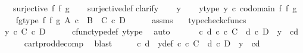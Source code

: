 \begin{isabellebody}
\ \ \ {\isachardoublequoteopen}surjective\ {\isacharparenleft}{\kern0pt}f\ {\isasymtimes}\isactrlsub f\ g{\isacharparenright}{\kern0pt}{\isachardoublequoteclose}\isanewline
%
\isadelimproof
\ \ %
\endisadelimproof
%
\isatagproof
{}\isamarkupfalse%
\ surjective{\isacharunderscore}{\kern0pt}def\isanewline
{}\isamarkupfalse%
{\isacharparenleft}{\kern0pt}clarify{\isacharparenright}{\kern0pt}\isanewline
\ \ \isamarkupfalse%
\ y\isanewline
\ \ \isamarkupfalse%
\ y{\isacharunderscore}{\kern0pt}type{\isacharcolon}{\kern0pt}\ {\isachardoublequoteopen}y\ {\isasymin}\isactrlsub c\ codomain\ {\isacharparenleft}{\kern0pt}f\ {\isasymtimes}\isactrlsub f\ g{\isacharparenright}{\kern0pt}{\isachardoublequoteclose}\isanewline
\ \ \isamarkupfalse%
\ fg{\isacharunderscore}{\kern0pt}type{\isacharcolon}{\kern0pt}\ {\isachardoublequoteopen}f\ {\isasymtimes}\isactrlsub f\ g{\isacharcolon}{\kern0pt}\ A\ {\isasymtimes}\isactrlsub c\ \ B\ {\isasymrightarrow}\ C\ {\isasymtimes}\isactrlsub c\ D{\isachardoublequoteclose}\isanewline
\ \ \ \ \isamarkupfalse%
\ assms\ \ \isamarkupfalse%
\ typecheck{\isacharunderscore}{\kern0pt}cfuncs\ \ \ \ \isanewline
\ \ \isamarkupfalse%
\ \isamarkupfalse%
\ {\isachardoublequoteopen}y\ {\isasymin}\isactrlsub c\ C\ {\isasymtimes}\isactrlsub c\ D{\isachardoublequoteclose}\isanewline
\ \ \ \ \isamarkupfalse%
\ cfunc{\isacharunderscore}{\kern0pt}type{\isacharunderscore}{\kern0pt}def\ y{\isacharunderscore}{\kern0pt}type\ \isamarkupfalse%
\ auto\isanewline
\ \ \isamarkupfalse%
\ \isamarkupfalse%
\ {\isachardoublequoteopen}{\isasymexists}\ c\ d{\isachardot}{\kern0pt}\ c\ {\isasymin}\isactrlsub c\ C\ {\isasymand}\ d\ {\isasymin}\isactrlsub c\ D\ {\isasymand}\ y\ {\isacharequal}{\kern0pt}\ {\isasymlangle}c{\isacharcomma}{\kern0pt}d{\isasymrangle}{\isachardoublequoteclose}\isanewline
\ \ \ \ \isamarkupfalse%
\ cart{\isacharunderscore}{\kern0pt}prod{\isacharunderscore}{\kern0pt}decomp\ \isamarkupfalse%
\ blast\isanewline
\ \ \isamarkupfalse%
\ \isamarkupfalse%
\ c\ d\ \ y{\isacharunderscore}{\kern0pt}def{\isacharcolon}{\kern0pt}\ {\isachardoublequoteopen}c\ {\isasymin}\isactrlsub c\ C\ {\isasymand}\ d\ {\isasymin}\isactrlsub c\ D\ {\isasymand}\ y\ {\isacharequal}{\kern0pt}\ {\isasymlangle}c{\isacharcomma}{\kern0pt}d{\isasymrangle}{\isachardoublequoteclose}\isanewline

\end{isabellebody}
